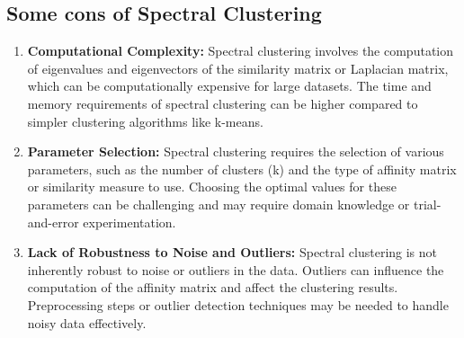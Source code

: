 \documentclass{article}
\begin{document}
    \subsection{Some cons of Spectral Clustering}
        \begin{enumerate}
            \item \textbf{Computational Complexity: }Spectral clustering involves the computation of eigenvalues and eigenvectors of the similarity matrix or Laplacian matrix, which can be computationally expensive for large datasets. The time and memory requirements of spectral clustering can be higher compared to simpler clustering algorithms like k-means.
            \item \textbf{Parameter Selection: }Spectral clustering requires the selection of various parameters, such as the number of clusters (k) and the type of affinity matrix or similarity measure to use. Choosing the optimal values for these parameters can be challenging and may require domain knowledge or trial-and-error experimentation.
            \item \textbf{Lack of Robustness to Noise and Outliers: }Spectral clustering is not inherently robust to noise or outliers in the data. Outliers can influence the computation of the affinity matrix and affect the clustering results. Preprocessing steps or outlier detection techniques may be needed to handle noisy data effectively.
        \end{enumerate}

\section{}
\end{document}
